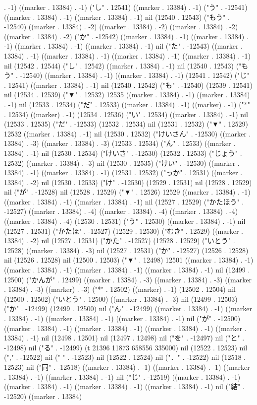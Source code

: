 . -1) ((marker . 13384) . -1) ("し" . 12541) ((marker . 13384) . -1) ("う" . -12541) ((marker . 13384) . -1) ((marker . 13384) . -1) nil (12540 . 12543) ("もう" . -12540) ((marker . 13384) . -2) ((marker . 13384) . -2) ((marker . 13384) . -2) ((marker . 13384) . -2) ("か" . -12542) ((marker . 13384) . -1) ((marker . 13384) . -1) ((marker . 13384) . -1) ((marker . 13384) . -1) nil ("た" . -12543) ((marker . 13384) . -1) ((marker . 13384) . -1) ((marker . 13384) . -1) ((marker . 13384) . -1) nil (12542 . 12544) ("し" . 12542) ((marker . 13384) . -1) nil (12540 . 12543) ("もう" . -12540) ((marker . 13384) . -1) ((marker . 13384) . -1) (12541 . 12542) ("じ" . 12541) ((marker . 13384) . -1) nil (12540 . 12542) ("も" . -12540) (12539 . 12541) nil (12534 . 12539) ("▼" . 12532) 12535 ((marker . 13384) . -1) ((marker . 13384) . -1) nil (12533 . 12534) ("だ" . 12533) ((marker . 13384) . -1) ((marker) . -1) ("*" . 12534) ((marker) . -1) (12534 . 12536) ("い" . 12534) ((marker . 13384) . -1) nil (12533 . 12535) ("だ" . -12533) (12532 . 12534) nil (12531 . 12532) ("▼" . 12529) 12532 ((marker . 13384) . -1) nil (12530 . 12532) ("けいさん" . -12530) ((marker . 13384) . -3) ((marker . 13384) . -3) (12533 . 12534) ("ん" . 12533) ((marker . 13384) . -1) nil (12530 . 12534) ("けいさ" . -12530) (12532 . 12533) ("じょう" . 12532) ((marker . 13384) . -3) nil (12530 . 12535) ("けい" . -12530) ((marker . 13384) . -1) ((marker . 13384) . -1) (12531 . 12532) ("っか" . 12531) ((marker . 13384) . -2) nil (12530 . 12533) ("け" . -12530) (12529 . 12531) nil (12528 . 12529) nil ("が" . -12528) nil (12528 . 12529) ("▼" . 12526) 12529 ((marker . 13384) . -1) ((marker . 13384) . -1) ((marker . 13384) . -1) nil (12527 . 12529) ("かたほう" . -12527) ((marker . 13384) . -4) ((marker . 13384) . -4) ((marker . 13384) . -4) ((marker . 13384) . -4) (12530 . 12531) ("う" . 12530) ((marker . 13384) . -1) nil (12527 . 12531) ("かたほ" . -12527) (12529 . 12530) ("むき" . 12529) ((marker . 13384) . -2) nil (12527 . 12531) ("かた" . -12527) (12528 . 12529) ("いとう" . 12528) ((marker . 13384) . -3) nil (12527 . 12531) ("か" . -12527) (12526 . 12528) nil (12526 . 12528) nil (12500 . 12503) ("▼" . 12498) 12501 ((marker . 13384) . -1) ((marker . 13384) . -1) ((marker . 13384) . -1) ((marker . 13384) . -1) nil (12499 . 12500) ("かんが" . 12499) ((marker . 13384) . -3) ((marker . 13384) . -3) ((marker . 13384) . -3) ((marker) . -3) ("*" . 12502) ((marker) . -1) (12502 . 12504) nil (12500 . 12502) ("いとう" . 12500) ((marker . 13384) . -3) nil (12499 . 12503) ("か" . -12499) (12499 . 12500) nil ("ん" . -12499) ((marker . 13384) . -1) ((marker . 13384) . -1) ((marker . 13384) . -1) ((marker . 13384) . -1) nil ("が" . -12500) ((marker . 13384) . -1) ((marker . 13384) . -1) ((marker . 13384) . -1) ((marker . 13384) . -1) nil (12498 . 12501) nil (12497 . 12498) nil ("を" . -12497) nil ("と" . -12498) nil ("る" . -12499) (t 21396 11873 658556 335000) nil (12522 . 12523) nil ("," . -12522) nil (" " . -12523) nil (12522 . 12524) nil ("．" . -12522) nil (12518 . 12523) nil ("同" . -12518) ((marker . 13384) . -1) ((marker . 13384) . -1) ((marker . 13384) . -1) ((marker . 13384) . -1) nil ("じ" . -12519) ((marker . 13384) . -1) ((marker . 13384) . -1) ((marker . 13384) . -1) ((marker . 13384) . -1) nil ("結" . -12520) ((marker . 13384) 